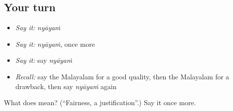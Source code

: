 \subsection*{Your turn}
\begin{itemize}
\raggedright
  \item \emph{Say it:} \emph{nyāyaṁ}
  \item \emph{Say it:} \emph{nyāyaṁ}, once more
  \item \emph{Say it:} say \emph{nyāyaṁ}
  \item \emph{Recall:} say the Malayalam for a good quality, then the Malayalam for a drawback, then say \emph{nyāyaṁ} again
\end{itemize}

\begin{tcolorbox}[breakable,colback=teal!4,colframe=teal!35!black,title={Before you move on}]
What does  mean? (\textquotedblleft{}Fairness, a justification\textquotedblright{}.) Say it once more.
\end{tcolorbox}
